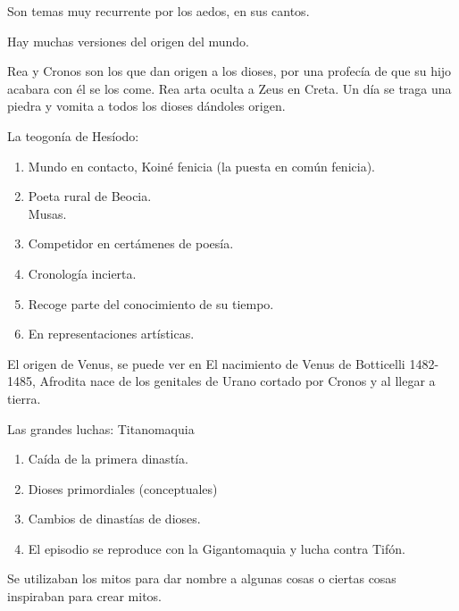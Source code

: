 Son temas muy recurrente por los aedos, en sus cantos.

Hay muchas versiones del origen del mundo.

Rea y Cronos son los que dan origen a los dioses, por una profecía de que su hijo acabara con él se los come. Rea arta oculta a Zeus en Creta. Un día se traga una piedra y vomita a todos los dioses dándoles origen.

La teogonía de Hesíodo:
\begin{enumerate}
  \item Mundo en contacto, Koiné fenicia (la puesta en común fenicia).
  \item Poeta rural de Beocia. \\ Musas.
  \item Competidor en certámenes de poesía.
  \item Cronología incierta.
  \item Recoge parte del conocimiento de su tiempo.
  \item En representaciones artísticas.
\end{enumerate}

El origen de Venus, se puede ver en El nacimiento de Venus de Botticelli 1482-1485, Afrodita nace de los genitales de Urano cortado por Cronos y al llegar a tierra.

Las grandes luchas: Titanomaquia
\begin{enumerate}
  \item Caída de la primera dinastía.
  \item Dioses primordiales (conceptuales)
  \item Cambios de dinastías de dioses.
  \item El episodio se reproduce con la Gigantomaquia y lucha contra Tifón.
\end{enumerate}

Se utilizaban los mitos para dar nombre a algunas cosas o ciertas cosas inspiraban para crear mitos.
